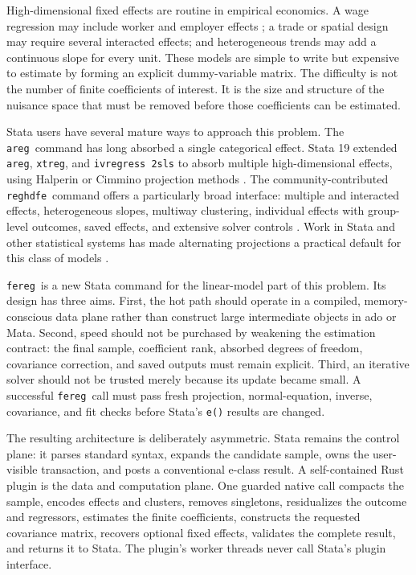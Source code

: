 \documentclass[11pt]{article}
\newcommand{\fereg}{\texttt{fereg}}
\newcommand{\reghdfe}{\texttt{reghdfe}}
\newcommand{\areg}{\texttt{areg}}
\newcommand{\xtreg}{\texttt{xtreg}}
\begin{document}
High-dimensional fixed effects are routine in empirical economics.  A wage
regression may include worker and employer effects
\citep{abowd1999high}; a trade or spatial design may require several
interacted effects; and heterogeneous trends may add a continuous slope for
every unit.  These models are simple to write but expensive to estimate by
forming an explicit dummy-variable matrix.  The difficulty is not the number
of finite coefficients of interest.  It is the size and structure of the
nuisance space that must be removed before those coefficients can be
estimated.

Stata users have several mature ways to approach this problem.  The
\areg\ command has long absorbed a single categorical effect.  Stata 19
extended \areg, \xtreg, and \texttt{ivregress 2sls} to absorb multiple
high-dimensional effects, using Halperin or Cimmino projection methods
\citep{stata2025hdfe,stata2025areg,stata2025xtreg}.  The community-contributed
\reghdfe\ command offers a particularly broad interface: multiple and
interacted effects, heterogeneous slopes, multiway clustering, individual
effects with group-level outcomes, saved effects, and extensive solver
controls \citep{correia2016feasible,correia2026reghdfe}.  Work in Stata and
other statistical systems has made alternating projections a practical
default for this class of models
\citep{guimaraes2010simple,gaure2013ols,somaini2016algorithm}.

\fereg\ is a new Stata command for the linear-model part of this problem.  Its
design has three aims.  First, the hot path should operate in a compiled,
memory-conscious data plane rather than construct large intermediate objects
in ado or Mata.  Second, speed should not be purchased by weakening the
estimation contract: the final sample, coefficient rank, absorbed degrees of
freedom, covariance correction, and saved outputs must remain explicit.
Third, an iterative solver should not be trusted merely because its update
became small.  A successful \fereg\ call must pass fresh projection,
normal-equation, inverse, covariance, and fit checks before Stata's
\texttt{e()} results are changed.

The resulting architecture is deliberately asymmetric.  Stata remains the
control plane: it parses standard syntax, expands the candidate sample, owns
the user-visible transaction, and posts a conventional e-class result.  A
self-contained Rust plugin is the data and computation plane.  One guarded
native call compacts the sample, encodes effects and clusters, removes
singletons, residualizes the outcome and regressors, estimates the finite
coefficients, constructs the requested covariance matrix, recovers optional
fixed effects, validates the complete result, and returns it to Stata.  The
plugin's worker threads never call Stata's plugin interface.
\end{document}
